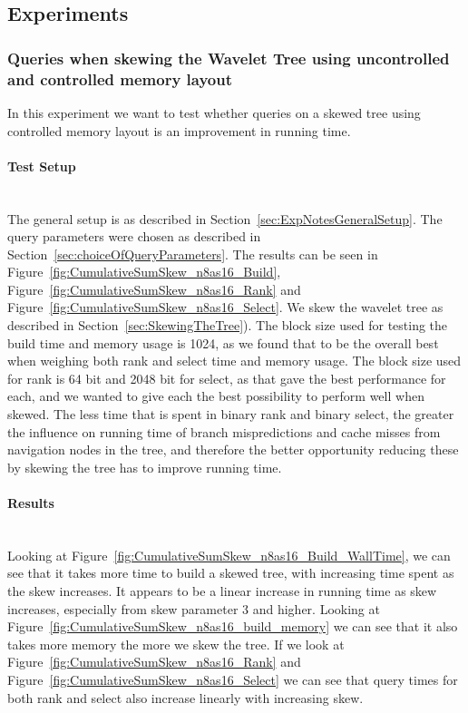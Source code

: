 \subsection{Experiments}

\subsubsection{Queries when skewing the Wavelet Tree using uncontrolled and controlled memory layout}
In this experiment we want to test whether queries on a skewed tree using controlled memory layout is an improvement in running time.

\paragraph{Test Setup}~\\
The general setup is as described in Section~\ref{sec:ExpNotesGeneralSetup}.
The query parameters were chosen as described in Section~\ref{sec:choiceOfQueryParameters}.
The results can be seen in Figure~\ref{fig:CumulativeSumSkew_n8as16_Build}, Figure~\ref{fig:CumulativeSumSkew_n8as16_Rank} and Figure~\ref{fig:CumulativeSumSkew_n8as16_Select}.
We skew the wavelet tree as described in Section~\ref{sec:SkewingTheTree}).
The block size used for testing the build time and memory usage is 1024, as we found that to be the overall best when weighing both rank and select time and memory usage.
The block size used for rank is 64 bit and 2048 bit for select, as that gave the best performance for each, and we wanted to give each the best possibility to perform well when skewed.
The less time that is spent in binary rank and binary select, the greater the influence on running time of branch mispredictions and cache misses from navigation nodes in the tree, and therefore the better opportunity reducing these by skewing the tree has to improve running time.

\paragraph{Results}~\\
Looking at Figure~\ref{fig:CumulativeSumSkew_n8as16_Build_WallTime}, we can see that it takes more time to build a skewed tree, with increasing time spent as the skew increases.
It appears to be a linear increase in running time as skew increases, especially from skew parameter 3 and higher.
Looking at Figure~\ref{fig:CumulativeSumSkew_n8as16_build_memory} we can see that it also takes more memory the more we skew the tree.
If we look at Figure~\ref{fig:CumulativeSumSkew_n8as16_Rank} and Figure~\ref{fig:CumulativeSumSkew_n8as16_Select} we can see that query times for both rank and select also increase linearly with increasing skew.


